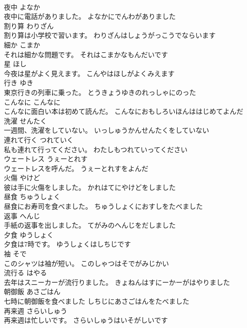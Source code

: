 \documentclass[8pt]{extreport}
\begin{document}
\begin{CJK}{UTF8}{min}
\\	夜中	よなか	
\\	夜中に電話がありました。	よなかにでんわがありました	
\\	割り算	わりざん	
\\	割り算は小学校で習います。	わりざんはしょうがっこうでならいます	
\\	細か	こまか	
\\	それは細かな問題です。	それはこまかなもんだいです	
\\	星	ほし	
\\	今夜は星がよく見えます。	こんやはほしがよくみえます	
\\	行き	ゆき	
\\	東京行きの列車に乗った。	とうきょうゆきのれっしゃにのった	
\\	こんなに	こんなに	
\\	こんなに面白い本は初めて読んだ。	こんなにおもしろいほんははじめてよんだ	
\\	洗濯	せんたく	
\\	一週間、洗濯をしていない。	いっしゅうかんせんたくをしていない	
\\	連れて行く	つれていく	
\\	私も連れて行ってください。	わたしもつれていってください	
\\	ウェートレス	うぇーとれす	
\\	ウェートレスを呼んだ。	うぇーとれすをよんだ	
\\	火傷	やけど	
\\	彼は手に火傷をしました。	かれはてにやけどをしました	
\\	昼食	ちゅうしょく	
\\	昼食にお寿司を食べました。	ちゅうしょくにおすしをたべました	
\\	返事	へんじ	
\\	手紙の返事を出しました。	てがみのへんじをだしました	
\\	夕食	ゆうしょく	
\\	夕食は7時です。	ゆうしょくはしちじです	
\\	袖	そで	
\\	このシャツは袖が短い。	このしゃつはそでがみじかい	
\\	流行る	はやる	
\\	去年はスニーカーが流行りました。	きょねんはすにーかーがはやりました	
\\	朝御飯	あさごはん	
\\	七時に朝御飯を食べました	しちじにあさごはんをたべました	
\\	再来週	さらいしゅう	
\\	再来週は忙しいです。	さらいしゅうはいそがしいです	

\end{CJK}
\end{document}
